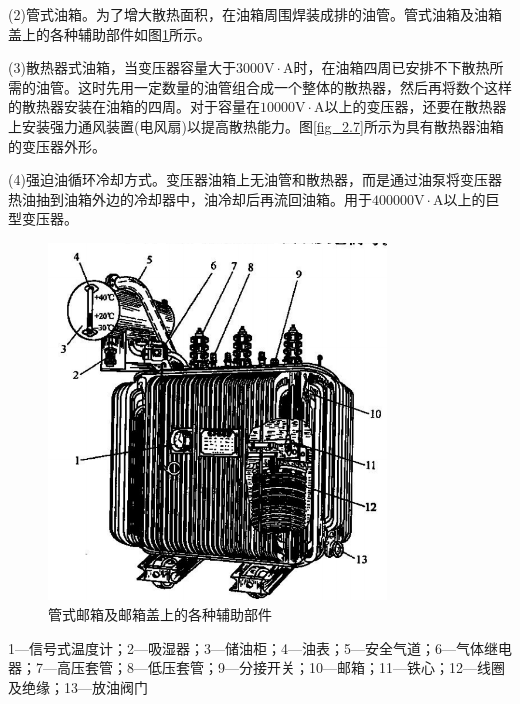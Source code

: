 \documentclass{book}
\begin{document}
(2)管式油箱。为了增大散热面积，在油箱周围焊装成排的油管。管式油箱及油箱盖上的各种辅助部件如图\ref{fig_2.6}所示。

(3)散热器式油箱，当变压器容量大于$3000\text{V}\cdot \text{A}$时，在油箱四周已安排不下散热所需的油管。这时先用一定数量的油管组合成一个整体的散热器，然后再将数个这样的散热器安装在油箱的四周。对于容量在$10000\text{V}\cdot \text{A}$以上的变压器，还要在散热器上安装强力通风装置(电风扇)以提高散热能力。图\ref{fig_2.7}所示为具有散热器油箱的变压器外形。

(4)强迫油循环冷却方式。变压器油箱上无油管和散热器，而是通过油泵将变压器热油抽到油箱外边的冷却器中，油冷却后再流回油箱。用于$400000\text{V}\cdot \text{A}$以上的巨型变压器。
\begin{figure}[H]
	\centering
	\includegraphics[width=0.80\textwidth]{2-6.png} 
	\caption{管式邮箱及邮箱盖上的各种辅助部件}
	\label{fig_2.6}
\end{figure}1—信号式温度计；2—吸湿器；3—储油柜；4—油表；5—安全气道；6—气体继电器；7—高压套管；8—低压套管；9—分接开关；10—邮箱；11—铁心；12—线圈及绝缘；13—放油阀门
\end{document}
